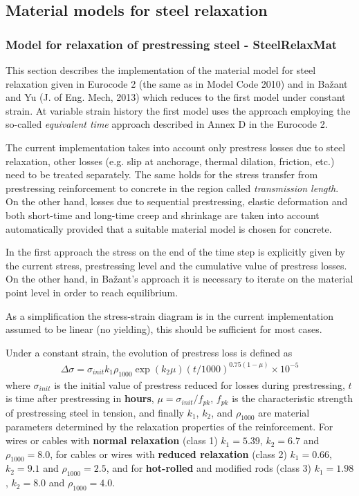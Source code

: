 \documentclass[a4paper]{article}
\begin{document}
\subsection{Material models for steel relaxation}

\subsubsection{Model for relaxation of prestressing steel - SteelRelaxMat}
This section describes the implementation of the material model for
steel relaxation given in Eurocode 2 (the same as in Model Code 2010)
and in Ba\v{z}ant and Yu (J. of Eng. Mech, 2013) which reduces to the first model under
constant strain. At variable strain history the first model uses the
approach employing the so-called {\sl{equivalent time}} approach
described in Annex D in the Eurocode 2.

The current implementation takes into account only prestress losses
due to steel relaxation, other losses (e.g. slip at anchorage,
thermal dilation, friction, etc.) need to be treated separately. The same holds
for the stress transfer from prestressing reinforcement to concrete in
the region called {\sl{transmission length}}. On the other hand,
losses due to sequential prestressing, elastic deformation and both
short-time and long-time creep and shrinkage are taken into account
automatically provided that a suitable material model is chosen for
concrete. 

In the first approach the stress on the end of the time step is
explicitly given by the current stress, prestressing level and the
cumulative value of prestress losses. On the other hand, in
Ba\v{z}ant's approach it is necessary to iterate on the material point
level in order to reach equilibrium.

As a simplification the stress-strain diagram is in the current
implementation assumed to be
linear (no yielding), this should be sufficient for most cases.

Under a constant strain, the evolution of prestress loss is defined as
\begin{eqnarray}
\Delta \sigma = \sigma_{init} k_1 \rho_{1000} \exp(k_2 \mu)
(t/1000)^{0.75(1-\mu)} \times 10^{-5}
\end{eqnarray}
where 
$\sigma_{init}$ is the initial value of prestress reduced for 
losses during prestressing, $t$ is time after prestressing in
\textbf{hours}, $\mu = \sigma_{init} / f_{pk}$, $f_{pk}$ is the
characteristic strength of prestressing steel in tension, and finally
$k_1$, $k_2$, and $\rho_{1000}$ are material parameters determined by
the relaxation properties of the reinforcement.
For wires or cables with \textbf{normal relaxation} (class 1) $k_1 = 5.39$,
$k_2 = 6.7$ and $\rho_{1000} = 8.0$, for cables or wires with
\textbf{reduced relaxation} (class 2) $k_1 = 0.66$,
$k_2 = 9.1$ and $\rho_{1000} = 2.5$, and for \textbf{hot-rolled}
and modified rods (class 3) $k_1 = 1.98$, $k_2 = 8.0$ and $\rho_{1000}
= 4.0$.
\end{document}
